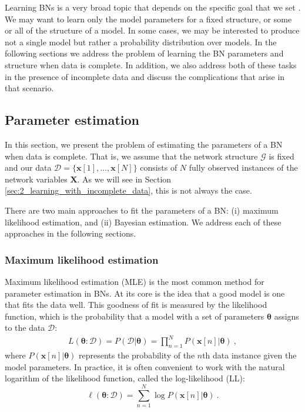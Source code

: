 
Learning BNs is a very broad topic that depends on the specific goal that we set \citep{daly2011}. We may want to learn only the model parameters for a fixed structure, or some or all of the structure of a model. In some cases, we may be interested to produce not a single model but rather a probability distribution over models. In the following sections we address the problem of learning the BN parameters and structure when data is complete. In addition, we also address both of these tasks in the presence of incomplete data and discuss the complications that arise in that scenario.
\subsection{Parameter estimation} \label{sec:2_parameter_learning}
In this section, we present the problem of estimating the parameters of a BN when data is complete. That is, we assume that the network structure $\mathcal{G}$ is fixed and our data $\mathcal{D} = \{\mathbf{x}[1], \dots, \mathbf{x}[N]\}$ consists of $N$ fully observed instances of the network variables $\mathbf{X}$. As we will see in Section \ref{sec:2_learning_with_incomplete_data}, this is not always the case.

There are two main approaches to fit the parameters of a BN: (i) maximum likelihood estimation, and (ii) Bayesian estimation. We address each of these approaches in the following sections.
\subsubsection{Maximum likelihood estimation} \label{sec:2_maximum_likelihood_estimation}
Maximum likelihood estimation (MLE) is the most common method for parameter estimation in BNs. At its core is the idea that a good model is one that fits the data well. This goodness of fit is measured by the likelihood function, which is the probability that a model with a set of parameters $\bm{\theta}$ assigns to the data $\mathcal{D}$:
\begin{align} \label{eq:likelihood_function}
L(\bm{\theta}: \mathcal{D}) = P(\mathcal{D} | \bm{\theta}) = \prod_{n=1}^{N} P(\mathbf{x}[n] | \bm{\theta}) \ ,
\end{align}
where $P(\mathbf{x}[n] | \bm{\theta})$ represents the probability of the $n$th data instance given the model parameters. In practice, it is often convenient to work with the natural logarithm of the likelihood function, called the log-likelihood (LL):
\begin{equation*}
\ell(\bm{\theta}: \mathcal{D}) = \sum_{n=1}^{N} \log P(\mathbf{x}[n] | \bm{\theta}) \ .
\end{equation*}

